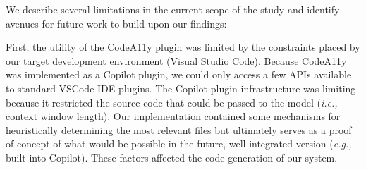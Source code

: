 We describe several limitations in the current scope of the study and identify avenues for future work to build upon our findings:

First, the utility of the CodeA11y plugin was limited by the constraints placed by our target development environment (Visual Studio Code). 
Because CodeA11y was implemented as a Copilot plugin, we could only access a few APIs available to standard VSCode IDE plugins. The Copilot plugin infrastructure was limiting because it restricted the source code that could be passed to the model (\textit{i.e.,} context window length). Our implementation contained some mechanisms for heuristically determining the most relevant files but ultimately serves as a proof of concept of what would be possible in the future, well-integrated version (\textit{e.g.,} built into Copilot). These factors affected the code generation of our system.

